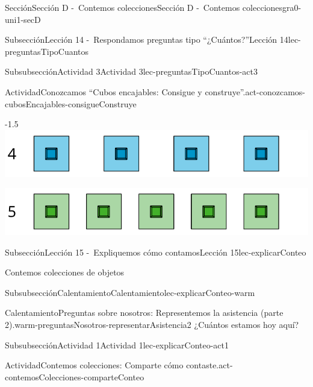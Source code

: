 \documentclass[twoside,10pt,]{article}
\begin{document}
\begin{sectionptx}{Sección}{Sección D -~Contemos colecciones}{}{Sección D -~Contemos colecciones}{}{}{gra0-uni1-secD}
\begin{subsectionptx}{Subsección}{Lección 14 -~Respondamos preguntas tipo “¿Cuántos?”}{}{Lección 14}{}{}{lec-preguntasTipoCuantos}
\begin{subsubsectionptx}{Subsubsección}{Actividad 3}{}{Actividad 3}{}{}{lec-preguntasTipoCuantos-act3}
\begin{activity}{Actividad}{Conozcamos “Cubos encajables: Consigue y construye”.}{act-conozcamos-cubosEncajables-consigueConstruye}
\begin{image}{0}{1}{0}{-1.5\baselineskip}
\includegraphics[width=\linewidth]{external/svg-source/tikz-file-148187.pdf}
\end{image}%
\begin{image}{0}{1}{0}{}%
\includegraphics[width=\linewidth]{external/svg-source/tikz-file-148188.pdf}
\end{image}%
\end{activity}%
\end{subsubsectionptx}
\end{subsectionptx}
%
%
\typeout{************************************************}
\typeout{************************************************}
%
\begin{subsectionptx}{Subsección}{Lección 15 -~Expliquemos cómo contamos}{}{Lección 15}{}{}{lec-explicarConteo}
\begin{introduction}{}%
Contemos colecciones de objetos%
\end{introduction}%
%
%
\typeout{************************************************}
\typeout{************************************************}
%
\begin{subsubsectionptx}{Subsubsección}{Calentamiento}{}{Calentamiento}{}{}{lec-explicarConteo-warm}
\begin{exploration}{Calentamiento}{Preguntas sobre nosotros: Representemos la asistencia (parte 2).}{warm-preguntasNosotros-representarAsistencia2}%
¿Cuántos estamos hoy aquí?%
\end{exploration}%
\end{subsubsectionptx}
%
%
\typeout{************************************************}
\typeout{************************************************}
%
\begin{subsubsectionptx}{Subsubsección}{Actividad 1}{}{Actividad 1}{}{}{lec-explicarConteo-act1}
\begin{activity}{Actividad}{Contemos colecciones: Comparte cómo contaste.}{act-contemosColecciones-comparteConteo}%

\end{activity}
\end{subsubsectionptx}
\end{subsectionptx}
\end{sectionptx}
\end{document}
